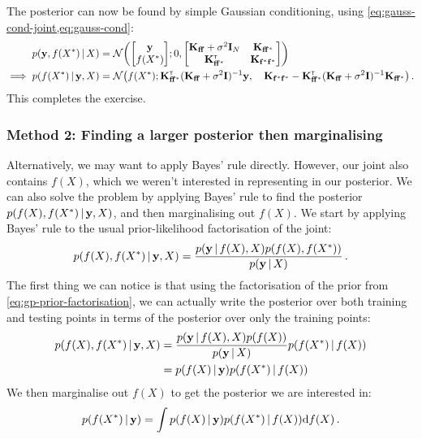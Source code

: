 \documentclass[a4paper]{article}
\newcommand{\K}{\mathbf{K}}
\theoremstyle{definition}
\begin{document}
The posterior can now be found by simple Gaussian conditioning, using \cref{eq:gauss-cond-joint,eq:gauss-cond}:
\begin{align}
p(\vy, f(X^*)\given X) &= \NormDist{\begin{bmatrix}\vy \\ f(X^*)\end{bmatrix}; 0, \begin{bmatrix}\Kff + \sigma^2\mathbf{I}_N & \K_{\vf\vf^*} \\ \K_{\vf\vf^*}\transpose & \K_{\vf^*\vf^*}\end{bmatrix}} \\ %
\implies p(f(X^*)\given \vy, X) &= \NormDist{f(X^*); \Kfp\transpose(\Kff+\sigma^2\mathbf{I})\inv \vy, \quad \Kpp  - \Kfp\transpose(\Kff+\sigma^2\mathbf{I})\inv\Kfp} \,.
\end{align}
This completes the exercise.

\subsubsection{Method 2: Finding a larger posterior then marginalising}
\label{sec:larger-posterior}
Alternatively, we may want to apply Bayes' rule directly. However, our joint also contains $f(X)$, which we weren't interested in representing in our posterior. We can also solve the problem by applying Bayes' rule to find the posterior $p(f(X), f(X^*)\,|\,\mathbf{y}, X)$, and then marginalising out $f(X)$. We start by applying Bayes' rule to the usual prior-likelihood factorisation of the joint:
\begin{align}
p(f(X), f(X^*)\,|\, \mathbf{y}, X) = \frac{p(\mathbf{y}\,|\, f(X), X) p(f(X), f(X^*))}{p(\mathbf{y}\,|\, X)} \,.
\end{align}
The first thing we can notice is that using the factorisation of the prior from \cref{eq:gp-prior-factorisation}, we can actually write the posterior over both training and testing points in terms of the posterior over only the training points:
\begin{align}
p(f(X), f(X^*)\,|\, \mathbf{y}, X) &= \frac{p(\mathbf{y}\,|\, f(X), X) p(f(X))}{p(\mathbf{y}\,|\, X)} p(f(X^*)\,|\, f(X)) \\
&= p(f(X)\,|\, \mathbf{y}) p(f(X^*)\,|\, f(X))
\end{align}
We then marginalise out $f(X)$ to get the posterior we are interested in:
\begin{align}
p(f(X^*)\,|\,\mathbf{y}) = \int p(f(X)\,|\, \mathbf{y}) p(f(X^*)\,|\, f(X))\mathrm{d}{f(X)} \,.
\end{align}
\end{document}
